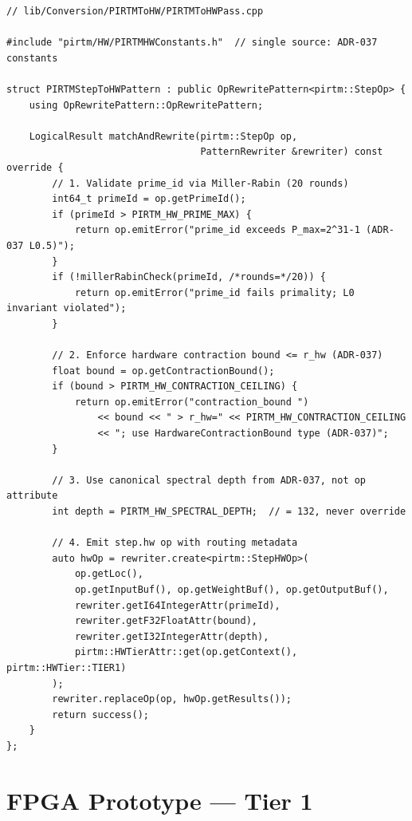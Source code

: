 \documentclass[12pt,letterpaper]{article}
\theoremstyle{plain}
\theoremstyle{definition}
\theoremstyle{remark}
\begin{document}
\begin{lstlisting}[style=cppstyle, caption={\texttt{PIRTMToHWPass.cpp} --- hardware lowering pass}, label=lst:pass]
// lib/Conversion/PIRTMToHW/PIRTMToHWPass.cpp

#include "pirtm/HW/PIRTMHWConstants.h"  // single source: ADR-037 constants

struct PIRTMStepToHWPattern : public OpRewritePattern<pirtm::StepOp> {
    using OpRewritePattern::OpRewritePattern;

    LogicalResult matchAndRewrite(pirtm::StepOp op,
                                  PatternRewriter &rewriter) const override {
        // 1. Validate prime_id via Miller-Rabin (20 rounds)
        int64_t primeId = op.getPrimeId();
        if (primeId > PIRTM_HW_PRIME_MAX) {
            return op.emitError("prime_id exceeds P_max=2^31-1 (ADR-037 L0.5)");
        }
        if (!millerRabinCheck(primeId, /*rounds=*/20)) {
            return op.emitError("prime_id fails primality; L0 invariant violated");
        }

        // 2. Enforce hardware contraction bound <= r_hw (ADR-037)
        float bound = op.getContractionBound();
        if (bound > PIRTM_HW_CONTRACTION_CEILING) {
            return op.emitError("contraction_bound ")
                << bound << " > r_hw=" << PIRTM_HW_CONTRACTION_CEILING
                << "; use HardwareContractionBound type (ADR-037)";
        }

        // 3. Use canonical spectral depth from ADR-037, not op attribute
        int depth = PIRTM_HW_SPECTRAL_DEPTH;  // = 132, never override

        // 4. Emit step.hw op with routing metadata
        auto hwOp = rewriter.create<pirtm::StepHWOp>(
            op.getLoc(),
            op.getInputBuf(), op.getWeightBuf(), op.getOutputBuf(),
            rewriter.getI64IntegerAttr(primeId),
            rewriter.getF32FloatAttr(bound),
            rewriter.getI32IntegerAttr(depth),
            pirtm::HWTierAttr::get(op.getContext(), pirtm::HWTier::TIER1)
        );
        rewriter.replaceOp(op, hwOp.getResults());
        return success();
    }
};
\end{lstlisting}

\section{FPGA Prototype --- Tier 1}
\end{document}

